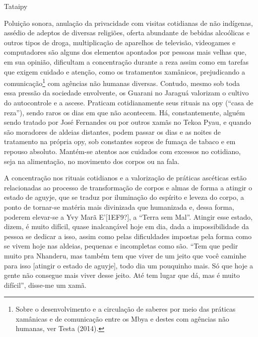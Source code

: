 \documentclass{article}
\begin{document}
Tataipy

Polui\c{c}\~ao sonora, anula\c{c}\~ao da privacidade com visitas
cotidianas de n\~ao ind\'igenas, ass\'edio de adeptos de diversas
religi\~oes, oferta abundante de bebidas alco\'olicas e outros tipos de
droga, multiplica\c{c}\~ao de aparelhos de televis\~ao, videogames e
computadores s\~ao alguns dos elementos apontados por pessoas mais
velhas que, em sua opini\~ao, dificultam a concentra\c{c}\~ao durante a
reza assim como em tarefas que exigem cuidado e aten\c{c}\~ao, como os
tratamentos xam\^anicos, prejudicando a comunica\c{c}\~ao\footnote{
Sobre o desenvolvimento e a circula\c{c}\~ao de saberes por meio das
pr\'aticas xam\^anicas e de comunica\c{c}\~ao entre os Mbya e destes
com ag\^encias n\~ao humanas, ver Testa (2014).} com ag\^encias n\~ao
humanas diversas. Contudo, mesmo sob toda essa press\~ao da sociedade
envolvente, os Guarani no Jaragu\'a valorizam o cultivo do autocontrole
e a ascese. Praticam cotidianamente seus rituais na opy
({\textquotedblleft}casa de reza{\textquotedblright}), sendo raros os
dias em que n\~ao acontecem. H\'a, constantemente, algu\'em sendo
tratado por Jos\'e Fernandes ou por outros xam\~as no Tekoa Pyau, e
quando s\~ao moradores de aldeias distantes, podem passar os dias e as
noites de tratamento na pr\'opria opy, sob constantes sopros de
fuma\c{c}a de tabaco e em repouso absoluto. Mant\'em-se atentos aos
cuidados com excessos no cotidiano, seja na alimenta\c{c}\~ao, no
movimento dos corpos ou na fala.

A concentra\c{c}\~ao nos rituais cotidianos e a valoriza\c{c}\~ao de
pr\'aticas asc\'eticas est\~ao relacionadas ao processo de
transforma\c{c}\~ao de corpos e almas de forma a atingir o estado de
aguyje, que se traduz por ilumina\c{c}\~ao do esp\'irito e leveza do
corpo, a ponto de tornar-se mat\'eria mais divinizada que humanizada e,
dessa forma, poderem elevar-se a Yvy Mar\~a E{\textquoteright}[1EF9?],
a {\textquotedblleft}Terra sem Mal{\textquotedblright}. Atingir esse
estado, dizem, \'e muito dif\'icil, quase inalcan\c{c}\'avel hoje em
dia, dada a impossibilidade da pessoa se dedicar a isso, assim como
pelas dificuldades impostas pela forma como se vivem hoje nas aldeias,
pequenas e incompletas como s\~ao. {\textquotedblleft}Tem que pedir
muito pra Nhanderu, mas tamb\'em tem que viver de um jeito que voc\^e
caminhe para isso [atingir o estado de aguyje], todo dia um pouquinho
mais. S\'o que hoje a gente n\~ao consegue mais viver desse jeito.
At\'e tem lugar que d\'a, mas \'e muito dif\'icil{\textquotedblright},
disse-me um xam\~a.
\end{document}
